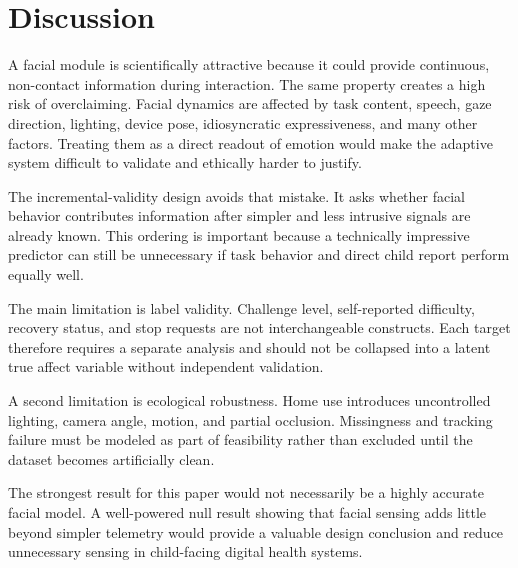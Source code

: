 \section{Discussion}

A facial module is scientifically attractive because it could provide continuous, non-contact information during interaction. The same property creates a high risk of overclaiming. Facial dynamics are affected by task content, speech, gaze direction, lighting, device pose, idiosyncratic expressiveness, and many other factors. Treating them as a direct readout of emotion would make the adaptive system difficult to validate and ethically harder to justify.

The incremental-validity design avoids that mistake. It asks whether facial behavior contributes information after simpler and less intrusive signals are already known. This ordering is important because a technically impressive predictor can still be unnecessary if task behavior and direct child report perform equally well.

The main limitation is label validity. Challenge level, self-reported difficulty, recovery status, and stop requests are not interchangeable constructs. Each target therefore requires a separate analysis and should not be collapsed into a latent true affect variable without independent validation.

A second limitation is ecological robustness. Home use introduces uncontrolled lighting, camera angle, motion, and partial occlusion. Missingness and tracking failure must be modeled as part of feasibility rather than excluded until the dataset becomes artificially clean.

The strongest result for this paper would not necessarily be a highly accurate facial model. A well-powered null result showing that facial sensing adds little beyond simpler telemetry would provide a valuable design conclusion and reduce unnecessary sensing in child-facing digital health systems.

